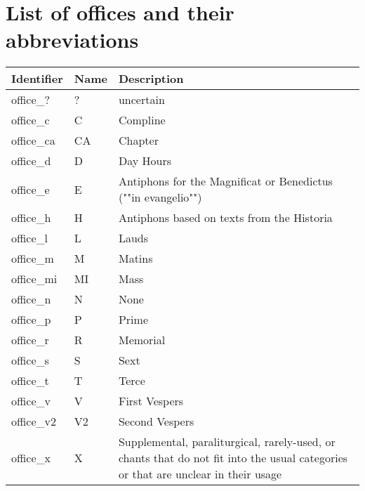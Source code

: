 \chapter{List of offices and their abbreviations}
\label{attachment:offices}

\begin{longtable}{| p{} | p{} | p{} |}

\hline
Identifier & Name & Description \\
\hline
office\_? & ? & uncertain \\
office\_c & C & Compline \\
office\_ca & CA & Chapter \\
office\_d & D & Day Hours \\
office\_e & E & Antiphons for the Magnificat or Benedictus (""in evangelio"") \\
office\_h & H & Antiphons based on texts from the Historia \\
office\_l & L & Lauds \\
office\_m & M & Matins \\
office\_mi & MI & Mass \\
office\_n & N & None \\
office\_p & P & Prime \\
office\_r & R & Memorial \\
office\_s & S & Sext \\
office\_t & T & Terce \\
office\_v & V & First Vespers \\
office\_v2 & V2 & Second Vespers \\
office\_x & X & Supplemental, paraliturgical, rarely-used, or chants that do not fit into the usual categories or that are unclear in their usage \\
\hline

\end{longtable}